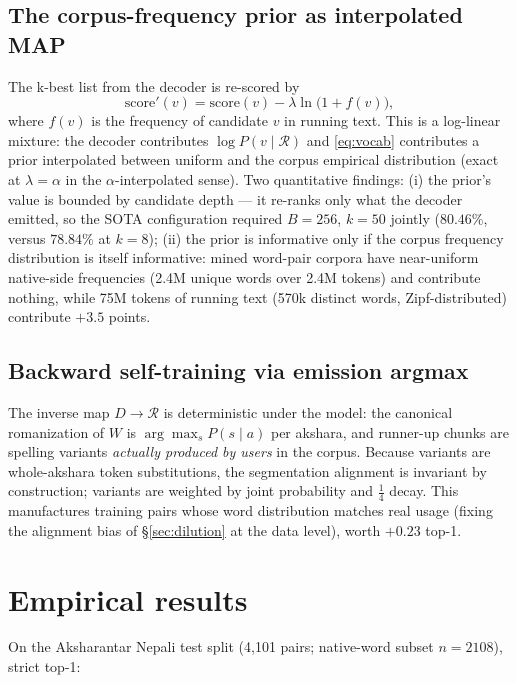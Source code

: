 \documentclass[11pt,a4paper]{article}
\newcommand{\R}{\mathcal{R}}
\begin{document}
\subsection{The corpus-frequency prior as interpolated MAP}
The k-best list from the decoder is re-scored by
\begin{equation}
\mathrm{score}'(v) = \mathrm{score}(v) - \lambda \ln\!\big(1 + f(v)\big),
\label{eq:vocab}
\end{equation}
where $f(v)$ is the frequency of candidate $v$ in running text. This is a
log-linear mixture: the decoder contributes $\log P(v \mid \R)$ and
\eqref{eq:vocab} contributes a prior interpolated between uniform and the
corpus empirical distribution (exact at $\lambda = \alpha$ in the
$\alpha$-interpolated sense). Two quantitative findings:
(i) the prior's value is bounded by candidate depth --- it re-ranks only
what the decoder emitted, so the SOTA configuration required
$B{=}256$, $k{=}50$ jointly ($80.46\%$, versus $78.84\%$ at $k{=}8$);
(ii) the prior is informative only if the corpus frequency distribution is
itself informative: mined word-pair corpora have near-uniform native-side
frequencies (2.4M unique words over 2.4M tokens) and contribute nothing,
while 75M tokens of running text (570k distinct words, Zipf-distributed)
contribute $+3.5$ points.

\subsection{Backward self-training via emission argmax}
The inverse map $D \to \R$ is deterministic under the model: the canonical
romanization of $W$ is $\arg\max_s P(s \mid a)$ per akshara, and runner-up
chunks are spelling variants \emph{actually produced by users} in the
corpus. Because variants are whole-akshara token substitutions, the
segmentation alignment is invariant by construction; variants are weighted
by joint probability and $\tfrac14$ decay. This manufactures training pairs
whose word distribution matches real usage (fixing the alignment bias of
\S\ref{sec:dilution} at the data level), worth $+0.23$ top-1.

\section{Empirical results}

On the Aksharantar Nepali test split \citep{aksharantar} (4{,}101 pairs;
native-word subset $n{=}2108$), strict top-1:
\end{document}
